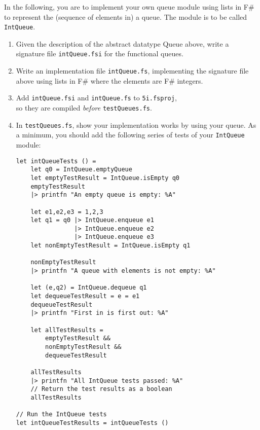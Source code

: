 In the following, you are to implement your own queue module using lists in F\# to represent the (sequence of elements in) a queue. The module is to be called \lstinline{IntQueue}.
\begin{enumerate}
\item Given the description of the abstract datatype Queue above, write a signature file \texttt{intQueue.fsi} for the functional queues. 
\item Write an implementation file \texttt{intQueue.fs}, implementing the signature file above using lists in F\# where the elements are F\# integers.
\item Add \texttt{intQueue.fsi} and \texttt{intQueue.fs} to \texttt{5i.fsproj},\\so they are compiled \textit{before} \texttt{testQueues.fs}.
\item In \texttt{testQueues.fs}, show your implementation works by using your queue. As a minimum, you should add the following series of tests of your \texttt{IntQueue} module:
\begin{lstlisting}
let intQueueTests () =
    let q0 = IntQueue.emptyQueue
    let emptyTestResult = IntQueue.isEmpty q0
    emptyTestResult
    |> printfn "An empty queue is empty: %A"

    let e1,e2,e3 = 1,2,3
    let q1 = q0 |> IntQueue.enqueue e1
                |> IntQueue.enqueue e2
                |> IntQueue.enqueue e3
    let nonEmptyTestResult = IntQueue.isEmpty q1

    nonEmptyTestResult
    |> printfn "A queue with elements is not empty: %A"

    let (e,q2) = IntQueue.dequeue q1
    let dequeueTestResult = e = e1
    dequeueTestResult
    |> printfn "First in is first out: %A" 

    let allTestResults =
        emptyTestResult &&
        nonEmptyTestResult &&
        dequeueTestResult

    allTestResults
    |> printfn "All IntQueue tests passed: %A"
    // Return the test results as a boolean
    allTestResults

// Run the IntQueue tests
let intQueueTestResults = intQueueTests ()

\end{lstlisting}
\end{enumerate}
